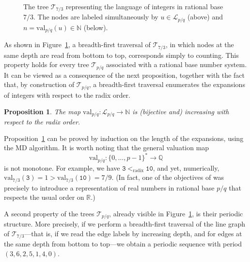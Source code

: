 \documentclass{template_arxiv}
\newtheorem{proposition}[theorem]{Proposition}
\numberwithin{equation}{section}
\newcommand{\N}{\mathbb N}
\newcommand{\lan}{\mathcal{L}}
\newcommand{\val}{\mathrm{val}}
\newcommand{\rad}{<_{\mathrm{radix}}}
\newcommand{\tree}{\mathcal{T}} %
\begin{document}
\begin{figure}[!h]
\begin{center}
		\normalsize
		\caption{\label{fig:tree} The tree $\mathcal{T}_{7/3}$ representing the language of integers in rational base $7/3$. The nodes are  labeled simultaneously by $u \in \lan_{p/q}$ (above)  and $n=\val_{p/q}(u) \in \N$ (below).}
	\end{center}
\end{figure}


As shown in Figure~\ref{fig:tree}, a breadth-first traversal of $\tree_{7/3}$, in which nodes at the same depth are read from bottom to top, corresponds simply to counting. This property holds for every tree $\tree_{p/q}$ associated with a rational base number system. It can be viewed as a consequence of the next proposition, together with the fact that, by construction of $\tree_{p/q}$, a breadth-first traversal enumerates the expansions of integers with respect to the radix order. 

\begin{proposition}\label{prop:radix_increasing}The map
$\val_{p/q} : \lan_{p/q} \to \mathbb{N}$
is (bijective and) increasing with respect to the radix order.
\end{proposition}


Proposition~\ref{prop:radix_increasing} can be proved by induction on the length of the expansions, using the MD algorithm. It is worth noting that the general valuation map
\[\val_{p/q} : \{0, \dots, p-1\}^* \to \mathbb{Q}\]
is not monotone. For example, we have $\mathtt{3}\rad \mathtt{10}$, and yet, numerically, $\val_{7/3}(\mathtt{3})=1 > \val_{7/3}(\mathtt{10})= 7/9.$ (In fact, one of the objectives of \cite{AFS08} was precisely to introduce a representation of real numbers in rational base $p/q$ that respects the usual order on $\mathbb{R}$.) 

\bigskip


A second property of the trees $\tree_{p/q}$, already visible in Figure~\ref{fig:tree}, is their periodic structure. More precisely, if we perform a breadth-first traversal of the line graph of $\tree_{7/3}$---that is, if we read the edge labels  by increasing depth, and for edges  at the same depth from bottom to top---we obtain a periodic sequence with period $(3,6,2,5,1,4,0)$. %
\end{document}

